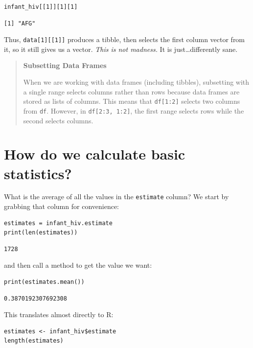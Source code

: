 \begin{lstlisting}
infant_hiv[[1]][1][1]
\end{lstlisting}

\begin{lstlisting}
[1] "AFG"
\end{lstlisting}

\noindent
Thus,
\texttt{data[1][[1]]} produces a tibble,
then selects the first column vector from it,
so it still gives us a vector.
\emph{This is not madness.}
It is just{\ldots}differently sane.

\begin{quote}
\textbf{Subsetting Data Frames}

When we are working with data frames (including tibbles),
subsetting with a single range selects columns rather than rows
because data frames are stored as lists of columns.
This means that \texttt{df[1:2]} selects two columns from \texttt{df}.
However, in \texttt{df[2:3, 1:2]},
the first range selects rows while the second selects columns.
\end{quote}

\section{How do we calculate basic statistics?}

What is the average of all the values in the \texttt{estimate} column?
We start by grabbing that column for convenience:

\begin{lstlisting}
estimates = infant_hiv.estimate
print(len(estimates))
\end{lstlisting}

\begin{lstlisting}
1728
\end{lstlisting}

\noindent
and then call a method to get the value we want:

\begin{lstlisting}
print(estimates.mean())
\end{lstlisting}

\begin{lstlisting}
0.3870192307692308
\end{lstlisting}

\noindent
This translates almost directly to R:

\begin{lstlisting}
estimates <- infant_hiv$estimate
length(estimates)
\end{lstlisting}

